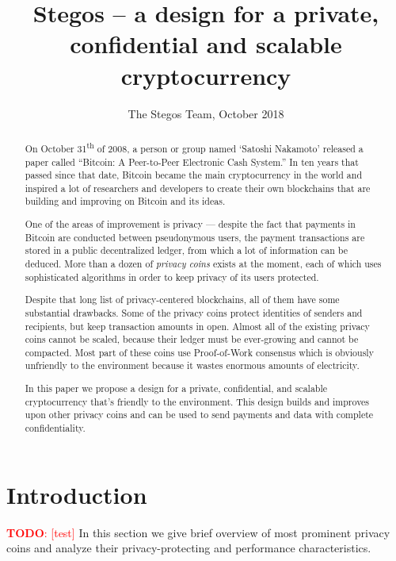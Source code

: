 \documentclass[a4paper, 10pt, conference]{ieeeconf}
\title{\LARGE \bf
Stegos  -- a design for a private, confidential and scalable cryptocurrency}
\author{The Stegos Team, October 2018}%
\newcommand\todo[1]{\textcolor{red}{\textbf{TODO}: [#1]}}
\begin{document}
\maketitle
\thispagestyle{empty}
\pagestyle{empty}


\begin{abstract}

    On October 31\textsuperscript{th} of 2008, a person or group named ‘Satoshi Nakamoto’ released a paper called ``Bitcoin: A Peer-to-Peer Electronic Cash System.''\cite{c1} In ten years that passed since that date, Bitcoin became the main cryptocurrency in the world and inspired a lot of researchers and developers to create their own blockchains that are building and improving on Bitcoin and its ideas.
    
    One of the areas of improvement is privacy --- despite the fact that payments in Bitcoin are conducted between pseudonymous users, the payment transactions are stored in a public decentralized ledger, from which a lot of information can be deduced. More than a dozen of \textit{privacy coins} exists at the moment, each of which uses sophisticated algorithms in order to keep privacy of its users protected. 
    
    Despite that long list of privacy-centered blockchains, all of them have some substantial drawbacks. Some of the privacy coins protect identities of senders and recipients, but keep transaction amounts in open. Almost all of the existing privacy coins cannot be scaled, because their ledger must be ever-growing and cannot be compacted. Most part of these coins use Proof-of-Work consensus which is obviously unfriendly to the environment because it wastes enormous amounts of electricity. 
    
    In this paper we propose a design for a private, confidential, and scalable cryptocurrency that’s friendly to the environment. This design builds and improves upon other privacy coins and can be used to send payments and data with complete confidentiality. 

\end{abstract}


\section{Introduction}
\todo{test}
In this section we give brief overview of most prominent privacy coins and analyze their privacy-protecting and performance characteristics.
\end{document}
